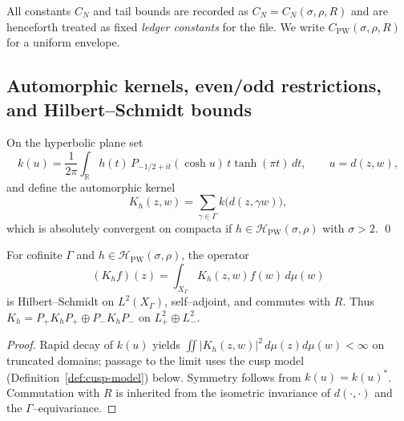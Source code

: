 \begin{remark}
\label{rem:quantitative-PW}
All constants $C_N$ and tail bounds are recorded as $C_N=C_N(\sigma,\rho,R)$ and are henceforth treated as fixed \emph{ledger constants} for the file. We write $C_{\mathrm{PW}}(\sigma,\rho,R)$ for a uniform envelope. %
\end{remark}


\subsection{Automorphic kernels, even/odd restrictions, and Hilbert–Schmidt bounds}
\label{subsec:ch6-part1-kernel} \relax \hspace{0pt}
\begin{definition}
\label{def:spherical-kernel}
On the hyperbolic plane set
\[
k(u)=\frac{1}{2\pi}\!\int_{\mathbb R} h(t)\,P_{-1/2+it}(\cosh u)\, t\tanh(\pi t)\,dt,\qquad u=d(z,w),
\]
and define the automorphic kernel
\[
K_h(z,w)=\sum_{\gamma\in\Gamma} k\!\big(d(z,\gamma w)\big),
\]
which is absolutely convergent on compacta if $h\in\mathcal H_{\mathrm{PW}}(\sigma,\rho)$ with $\sigma>2$. \qed
\end{definition}

\begin{lemma}
\label{lem:HS}
For cofinite $\Gamma$ and $h\in\mathcal H_{\mathrm{PW}}(\sigma,\rho)$, the operator
\[
(K_h f)(z)=\int_{X_\Gamma}K_h(z,w)f(w)\,d\mu(w)
\]
is Hilbert–Schmidt on $L^2(X_\Gamma)$, self–adjoint, and commutes with $R$. Thus $K_h=P_+K_hP_+ \oplus P_-K_hP_-$ on $L^2_+\oplus L^2_-$. 
\end{lemma}

\begin{proof}
Rapid decay of $k(u)$ yields $\iint |K_h(z,w)|^2\,d\mu(z)d\mu(w)<\infty$ on truncated domains; passage to the limit uses the cusp model (Definition~\ref{def:cusp-model}) below. Symmetry follows from $k(u)=k(u)^\ast$. Commutation with $R$ is inherited from the isometric invariance of $d(\cdot,\cdot)$ and the $\Gamma$–equivariance. %
\end{proof}


